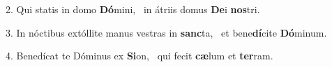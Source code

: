 2. Qui statis in domo \textbf{Dó}mini, \ast\  in átriis domus \textbf{De}i \textbf{nos}tri.\

3. In nóctibus extóllite manus vestras in \textbf{sanc}ta, \ast\  et bene\textbf{dí}cite \textbf{Dó}minum.\

4. Benedícat te Dóminus ex \textbf{Si}on, \ast\  qui fecit \textbf{cæ}lum et \textbf{ter}ram.\

